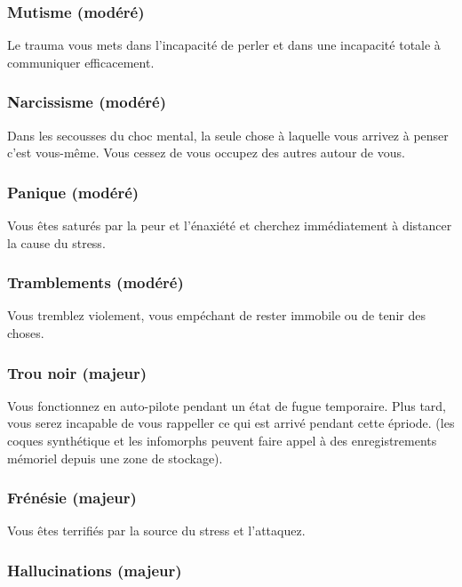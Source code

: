 \subsubsection{Mutisme (modéré)} 

Le trauma vous mets dans l'incapacité de perler et dans une incapacité totale à communiquer efficacement. 

\subsubsection{Narcissisme (modéré)} 

Dans les secousses du choc mental, la seule chose à laquelle vous arrivez à penser c'est vous-même. Vous cessez de vous occupez des autres autour de vous. 

\subsubsection{Panique (modéré)} 

Vous êtes saturés par la peur et l'énaxiété et cherchez immédiatement à distancer la cause du stress. 

\subsubsection{Tramblements (modéré)} 

Vous tremblez violement, vous empéchant de rester immobile ou de tenir des choses. 

\subsubsection{Trou noir (majeur)} 

Vous fonctionnez en auto-pilote pendant un état de fugue temporaire. Plus tard, vous serez incapable de vous rappeller ce qui est arrivé pendant cette épriode. (les coques synthétique et les infomorphs peuvent faire appel à des enregistrements mémoriel depuis une zone de stockage). 

\subsubsection{Frénésie (majeur)} 

Vous êtes terrifiés par la source du stress et l'attaquez. 

\subsubsection{Hallucinations (majeur)} 


